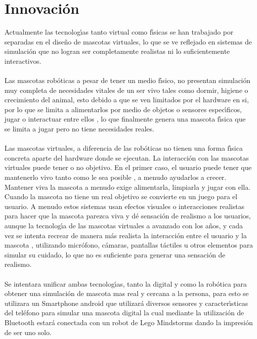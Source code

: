 \documentclass[letterpaper,12pt]{report} %
\numberwithin{equation}{section} %
\numberwithin{figure}{section} %
\numberwithin{table}{section} %
\begin{document}
\section{Innovaci\'on}
Actualmente las tecnolog\'{\i}as tanto virtual como f\'{\i}sicas se han trabajado por separadas en el dise\~no de mascotas virtuales, lo que se ve reflejado en sistemas de simulaci\'on que no logran ser completamente realistas ni lo suficientemente interactivos.\\~\\
Las mascotas rob\'oticas a pesar de tener un medio f\'{\i}sico, no presentan simulaci\'on muy completa de necesidades vitales de un ser vivo tales como dormir, higiene o crecimiento  del animal, esto debido a que se ven limitados por el hardware en si, por lo que se limita a alimentarlos por medio de objetos o sensores espec\'{\i}ficos, jugar o  interactuar entre ellos , lo que finalmente genera una mascota f\'{\i}sica que se limita a jugar pero no tiene necesidades reales.\\~\\
Las mascotas virtuales, a diferencia de las rob\'oticas no tienen una forma f\'{\i}sica concreta aparte del hardware donde se ejecutan. La interacci\'on con las mascotas virtuales puede tener o no objetivo. En el primer caso, el usuario puede tener que mantenerlo vivo tanto como le sea posible , a menudo ayudarlos a crecer. Mantener viva la mascota a menudo exige alimentarla, limpiarla y jugar con ella. Cuando la mascota no tiene un real objetivo se convierte en un juego para el usuario.  A menudo estos sistemas usan efectos visuales o interacciones realistas para hacer que la mascota parezca viva y d\'e sensaci\'on de realismo a los usuarios, aunque la tecnolog\'{\i}a de las mascotas virtuales a avanzado con los a\~nos, y cada vez se intenta recrear de manera m\'as realista la interacci\'on entre el usuario y la mascota , utilizando micr\'ofono, c\'amaras, pantallas t\'actiles u otros elementos  para simular su cuidado, lo que no es suficiente para generar una sensaci\'on de realismo. \\~\\
Se intentara unificar  ambas tecnolog\'{\i}as, tanto la  digital y como la rob\'otica para obtener una simulaci\'on de mascota mas real y cercana a la persona, para esto se utilizara un Smartphone android que utilizar\'a diversos  sensores y caracter\'{\i}sticas del tel\'efono para simular una mascota digital la cual mediante la utilizaci\'on de Bluetooth estar\'a conectada  con un robot de Lego Mindstorms dando la impresi\'on de ser uno solo.\\~\\
\end{document}
